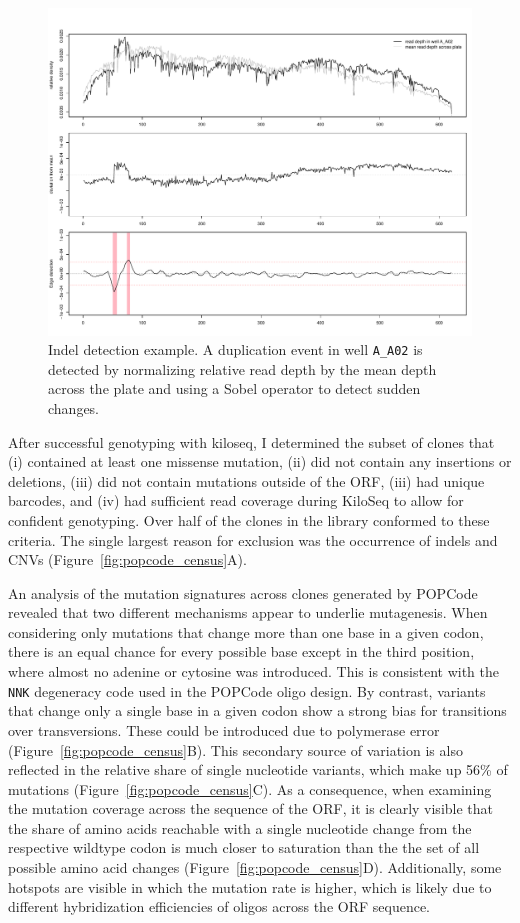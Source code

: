 \begin{figure}[h!]
	\centering
	\includegraphics[width=\textwidth]{img/border_detect.pdf}
	\caption{Indel detection example. A duplication event in well \texttt{A\_A02} is detected by normalizing relative read depth by the mean depth across the plate and using a Sobel operator to detect sudden changes.}
	\label{fig:border_detect}
\end{figure}


After successful genotyping with kiloseq, I determined the subset of clones that (i) contained at least one missense mutation, (ii) did not contain any insertions or deletions, (iii) did not contain mutations outside of the ORF, (iii) had unique barcodes, and (iv) had sufficient read coverage during KiloSeq to allow for confident genotyping.
Over half of the clones in the library conformed to these criteria. The single largest reason for exclusion was the occurrence of indels and CNVs (Figure~\ref{fig:popcode_census}A). 

An analysis of the mutation signatures across clones generated by POPCode revealed that two different mechanisms appear to underlie mutagenesis. When considering only mutations that change more than one base in a given codon, there is an equal chance for every possible base except in the third position, where almost no adenine or cytosine was introduced. This is consistent with the \texttt{NNK} degeneracy code used in the POPCode oligo design. By contrast, variants that change only a single base in a given codon show a strong bias for transitions over transversions. These could be introduced due to polymerase error (Figure~\ref{fig:popcode_census}B). This secondary source of variation is also reflected in the relative share of single nucleotide variants, which make up 56\% of mutations (Figure~\ref{fig:popcode_census}C). As a consequence, when examining the mutation coverage across the sequence of the ORF, it is clearly visible that the share of amino acids reachable with a single nucleotide change from the respective wildtype codon is much closer to saturation than the the set of all possible amino acid changes (Figure~\ref{fig:popcode_census}D). Additionally, some hotspots are visible in which the mutation rate is higher, which is likely due to different hybridization efficiencies of oligos across the ORF sequence.

